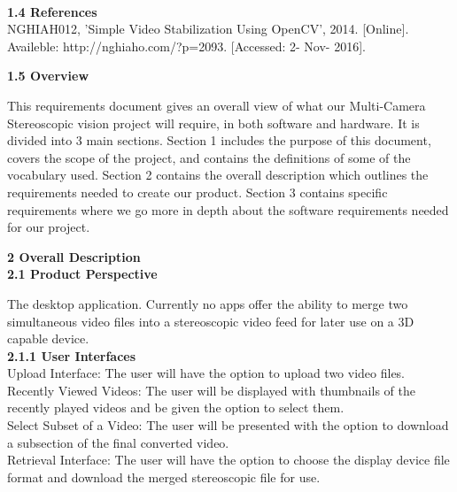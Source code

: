 \documentclass[10pt,draftclsnofoot,onecolumn]{IEEEtran}
\begin{document}
\\
\vspace{5mm}
{\Medium\textbf{1.4 References}}\\
\vspace{5mm}
NGHIAH012, 'Simple Video Stabilization Using OpenCV', 2014. [Online]. Availeble: http://nghiaho.com/?p=2093. [Accessed: 2- Nov- 2016].
\vspace{5mm}

{\Medium\textbf{1.5 Overview}}\\
\vspace{5mm}

This requirements document gives an overall view of what our Multi-Camera Stereoscopic vision project will require, in both software and hardware. It is divided into 3 main sections. Section 1 includes the purpose of this document, covers the scope of the project, and contains the definitions of some of the vocabulary used. Section 2 contains the overall description which outlines the requirements needed to create our product. Section 3 contains specific requirements where we go more in depth about the software requirements needed for our project. 
\\
\vspace{5mm}

{\Large\textbf{2 Overall Description}} \\
\vspace{5mm}
{\Medium\textbf{2.1 Product Perspective}} \\
\vspace{5mm}

The desktop application. Currently no apps offer the ability to merge two simultaneous video files into a stereoscopic video feed for later use on a 3D capable device.\\ 
\vspace{5mm}
{\Medium\textbf{2.1.1 User Interfaces}} \\

\vspace{5mm}
Upload Interface: The user will have the option to upload two video files.\\
\vspace{2mm}
			Recently Viewed Videos: The user will be displayed with thumbnails of the recently played videos and be given the option to select them.\\
			\vspace{2mm}
Select Subset of a Video: The user will be presented with the option to download a subsection of the final converted video.	\\
\vspace{2mm}
Retrieval Interface: The user will have the option to choose the display device file format and download the merged stereoscopic file for use.
\end{document}
